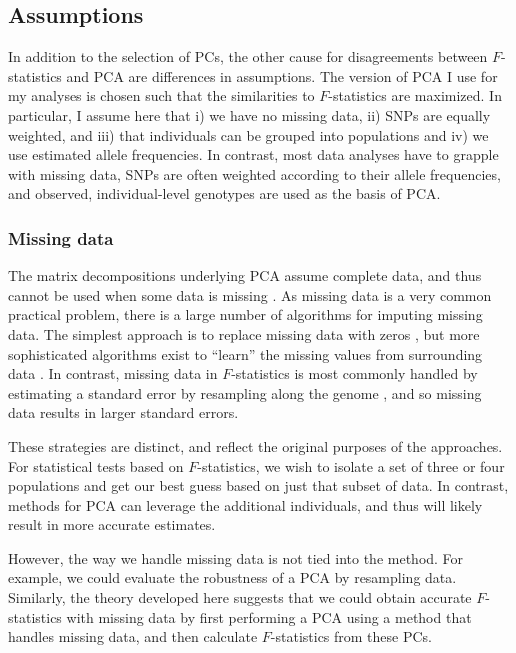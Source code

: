 \documentclass[12pt,fullpage, a4paper]{article}
\begin{document}
\subsection{Assumptions}
In addition to the selection of PCs, the other cause for disagreements between $F$-statistics and PCA are differences in assumptions. The version of PCA I use for my analyses is chosen such that the similarities to $F$-statistics are maximized. In particular, I assume here that i) we have no missing data, ii) SNPs are equally weighted, and iii) that individuals can be grouped into populations and iv) we use estimated allele frequencies. In contrast, most data analyses have to grapple with missing data, SNPs are often weighted according to their allele frequencies, and observed, individual-level genotypes are used as the basis of PCA.

\subsubsection{Missing data}
The matrix decompositions underlying PCA assume complete data, and thus cannot be used when some data is missing \citep{jolliffe2013}.  As missing data is a very common practical problem, there is a large number of algorithms for imputing missing data. The simplest approach is to replace missing data with zeros \citep[as implemented e.g. in][]{patterson2006}, but more sophisticated algorithms exist to ``learn'' the missing values from surrounding data \citep[e.g.][]{hastie2015,  meisner2021}. In contrast, missing data in $F$-statistics is most commonly handled by estimating a standard error by resampling along the genome \citep{patterson2012}, and so missing data results in larger standard errors. 

These strategies are distinct, and reflect the original purposes of the approaches. For statistical tests based on $F$-statistics, we wish to isolate a set of three or four populations and get our best guess based on just that subset of data. In contrast, methods for PCA can leverage the additional individuals, and thus will likely result in more accurate estimates.

However, the way we handle missing data is not tied into the method. For example, we could evaluate the robustness of a PCA by resampling data. Similarly, the theory developed here suggests that we could obtain accurate $F$-statistics with missing data by first performing a PCA using a method that handles missing data, and then calculate $F$-statistics from these PCs.
\end{document}
